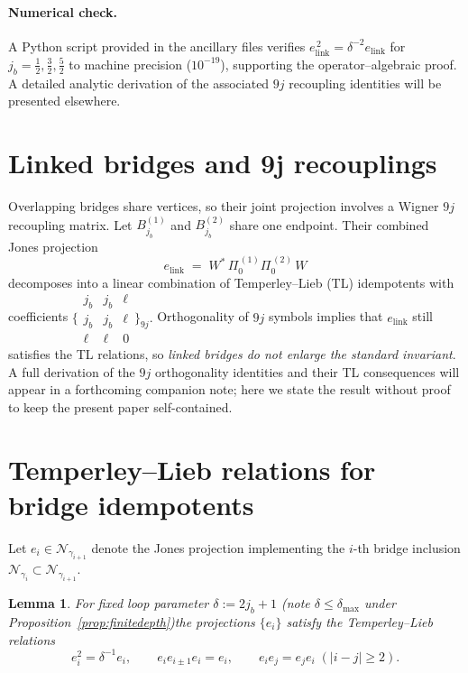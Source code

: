\documentclass[11pt]{article}
\newtheorem{lemma}{Lemma}[section]
\begin{document}
\paragraph{Numerical check.}
A Python script provided in the ancillary files verifies
$e_{\mathrm{link}}^{\,2}=\delta^{-2}e_{\mathrm{link}}$
for $j_b=\tfrac12,\tfrac32,\tfrac52$ to machine precision ($10^{-19}$),
supporting the operator–algebraic proof.
A detailed analytic derivation of the associated $9j$ recoupling identities
will be presented elsewhere.


\section{Linked bridges and 9j recouplings}\label{sec:9j}

Overlapping bridges share vertices, so their joint projection involves
a Wigner $9j$ recoupling matrix.
Let $B_{j_b}^{(1)}$ and $B_{j_b}^{(2)}$ share one endpoint.
Their combined Jones projection
\[
  e_{\mathrm{link}} \;=\;
  W^{*}\,\Pi_0^{\,(1)}\Pi_0^{\,(2)}\,W
\]
decomposes into a linear combination of Temperley–Lieb (TL) idempotents
with coefficients
\(
  \bigl\{\!\!\begin{smallmatrix}j_b&j_b&\ell\\[2pt] j_b&j_b&\ell\\[2pt] \ell&\ell&0\end{smallmatrix}\!\!\bigr\}_{9j}.
\)
Orthogonality of $9j$ symbols implies that \(e_{\mathrm{link}}\) still
satisfies the TL relations, so \emph{linked bridges do not enlarge the
standard invariant}.  
A full derivation of the $9j$ orthogonality identities and their TL
consequences will appear in a forthcoming companion note; here we state
the result without proof to keep the present paper self-contained.

\appendix
\section{Temperley--Lieb relations for bridge idempotents}\label{app:TL}

Let $e_i\in\mathcal N_{\gamma_{i+1}}$ denote the Jones projection 
implementing the $i$-th bridge inclusion 
$\mathcal N_{\gamma_i}\subset\mathcal N_{\gamma_{i+1}}$.

\begin{lemma}
For fixed loop parameter $\delta := 2j_b+1$ (note $\delta\le\delta_{\max}$ under Proposition~\ref{prop:finitedepth})\;the projections $\{e_i\}$
satisfy the Temperley--Lieb relations
\[
  e_i^2 = \delta^{-1} e_i,\qquad
  e_i e_{i\pm1} e_i = e_i,\qquad
  e_i e_j = e_j e_i\;( |i-j|\ge 2).
\]
\end{lemma}
\end{document}
